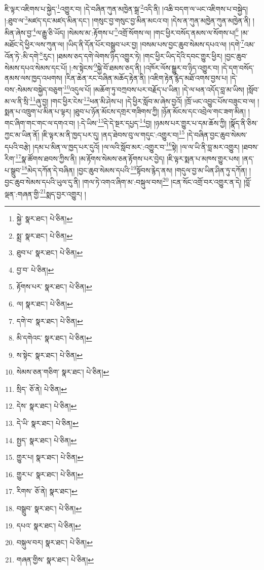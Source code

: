 ཇི་ལྟར་འཇིགས་པ་སྐྱེད་\footnote{སྐྱེ་  སྣར་ཐང་།  པེ་ཅིན། }འགྱུར་བ། །དེ་བཞིན་ཀུན་མཁྱེན་སྒྲ་\footnote{སྨྲ་  སྣར་ཐང་།  པེ་ཅིན། }འདི་ནི། །འཆི་བདག་ལ་ཡང་འཇིགས་པ་བསྐྱེད། །:ཐུབ་ལ་\footnote{ཐུབ་པ་  སྣར་ཐང་།  པེ་ཅིན། }མཛད་དང་མཛད་མིན་དང་། །གསུང་བྱ་གསུང་བྱ་མིན་མངའ་བ། །དེས་ན་ཀུན་མཁྱེན་ཀུན་མཁྱེན་ནི། །མིན་ཞེས་བྱ་\footnote{བྱ་བ་  པེ་ཅིན། }ལ་རྒྱུ་ཅི་ཡོད། །སེམས་མ་:རྟོགས་པ་\footnote{རྟོགས་པར་  སྣར་ཐང་།  པེ་ཅིན། }འགྲོ་སོགས་ལ། །གང་ཕྱིར་བསོད་ནམས་ལ་སོགས་པ།\footnote{ལ།  སྣར་ཐང་།  པེ་ཅིན། } །མ་མཐོང་དེ་ཕྱིར་ལས་ཀུན་ལ། །ཡིད་ནི་དོན་པོར་བསྒྲུབ་པར་བྱ། །བསམ་པས་བྱང་ཆུབ་སེམས་དཔའ་ལ། །དགེ་\footnote{དགེ་བ་  སྣར་ཐང་།  པེ་ཅིན། }འམ་འོན་ཏེ་:མི་དགེ་\footnote{མི་དགེའང་  སྣར་ཐང་།  པེ་ཅིན། }རུང་། །ཐམས་ཅད་དགེ་ལེགས་ཉིད་འགྱུར་ཏེ། །གང་ཕྱིར་ཡིད་དེའི་དབང་གྱུར་ཕྱིར། །བྱང་ཆུབ་སེམས་དཔའ་སེམས་དང་པོ། །:ས་སྟེངས་\footnote{ས་སྟེང་  སྣར་ཐང་།  པེ་ཅིན། }སྐྱེ་བོ་ཐམས་ཅད་ནི། །འཁོར་ལོས་སྒྱུར་བ་ཉིད་འགྱུར་བ། །དེ་དག་བསོད་ནམས་ལས་ཁྱད་འཕགས། །རིན་ཆེན་རང་བཞིན་མཆོད་རྟེན་ནི། །འཇིག་རྟེན་རྙེད་མཐོ་འགས་བྱས་པ། །དེ་བས་:སེམས་བསྐྱེད་བཅུག་\footnote{སེམས་ཅན་གཅིག་  སྣར་ཐང་།  པེ་ཅིན། }འདུལ་པོ། །མཆོག་ཏུ་བཀྲབས་པར་བརྗོད་པ་ཡིན། །དེ་ལ་ཕན་འདོད་བླ་མ་ཡིས། །སློབ་མ་ལ་ནི་སྲི་\footnote{སྲིད་  ཅོ་ནེ།  པེ་ཅིན། }ཞུ་བྱ། །གང་ཕྱིར་ངེས་\footnote{དེས་  སྣར་ཐང་།  པེ་ཅིན། }ཕན་མི་ཤེས་པ། །དེ་ཕྱིར་སློབ་མ་ཞེས་བྱའོ། །ཁྲོ་ཡང་འབྱུང་པོས་བཟུང་བ་ལ། །སྨན་པ་འཁྲུག་པ་མིན་པ་ལྟར། །ཐུབ་པ་ཉོན་མོངས་དགྲར་གཟིགས་ཀྱི། །ཉོན་མོངས་དང་འབྲེལ་གང་ཟག་མིན། །གང་ཞིག་གང་གང་ལ་དགའ་བ། །:དེ་ཡིས་\footnote{དེ་ཡི་  སྣར་ཐང་།  པེ་ཅིན། }དེ་དེ་སྔར་དཔྱད་\footnote{སྤྱད་  སྣར་ཐང་།  པེ་ཅིན། }བྱ། །ཉམས་པར་གྱུར་པ་དམ་ཆོས་ཀྱི། །སྣོད་ནི་ཅིས་ཀྱང་མ་ཡིན་ནོ། །ཇི་ལྟར་མ་ནི་ཁྱད་པར་དུ། །ནད་ཐེབས་བུ་ལ་གདུང་:འགྱུར་བ།\footnote{གྱུར་པ།  སྣར་ཐང་།  པེ་ཅིན། } །དེ་བཞིན་བྱང་ཆུབ་སེམས་དཔའི་བརྩེ། །དམ་པ་མིན་ལ་ཁྱད་པར་དུའོ། །ལ་ལའི་སློབ་མར་:འགྱུར་བ་\footnote{གྱུར་པ་  སྣར་ཐང་།  པེ་ཅིན། }སྟེ། །ལ་ལ་ཡི་ནི་བླ་མར་འགྱུར། །ཐབས་རིག་\footnote{རིགས་  ཅོ་ནེ།  སྣར་ཐང་། }སྣ་ཚོགས་ཐབས་ཀྱིས་ནི། །མ་རྟོགས་སེམས་ཅན་རྟོགས་པར་བྱེད། །ཇི་ལྟར་སྨན་པ་མཁས་གྱུར་པས། །ནད་པ་སྒྲུབ་\footnote{བསྒྲུབ་  སྣར་ཐང་།  པེ་ཅིན། }མེད་དཀོན་དེ་བཞིན། །བྱང་ཆུབ་སེམས་དཔའི་\footnote{དཔའ་  སྣར་ཐང་།  པེ་ཅིན། }སྟོབས་རྙེད་ནས། །གདུལ་བྱ་མ་ཡིན་ཤིན་ཏུ་དཀོན། །བྱང་ཆུབ་སེམས་དཔའི་ཡུལ་དུ་ནི། །གལ་ཏེ་འགའ་ཞིག་མ་:བསྐུལ་བས།\footnote{བསྐུལ་བར།  སྣར་ཐང་།  པེ་ཅིན། } །ངན་སོང་འགྲོ་བར་འགྱུར་ན་དེ། །བློ་ལྡན་:གཞན་གྱི་\footnote{གཞན་གྱིས་  སྣར་ཐང་།  པེ་ཅིན། }སྨད་བྱར་འགྱུར། །
